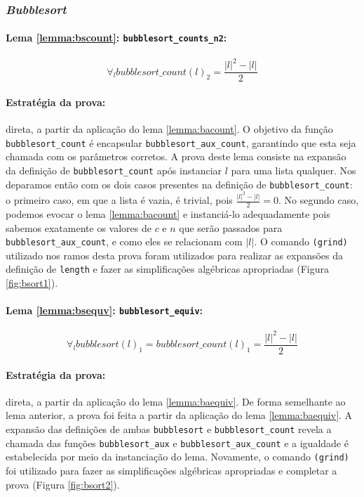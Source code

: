 \subsubsection{\textit{Bubblesort}}

\paragraph{Lema \ref{lemma:bscount}: \texttt{bubblesort\_counts\_n2}:}
\begin{equation*}
    \forall_{l} bubblesort\_count(l)_2 = \frac{|l|^2 - |l|}{2}
\end{equation*}

\paragraph{Estratégia da prova:} direta, a partir da aplicação do
lema \ref{lemma:bacount}. O objetivo da função \texttt{bubblesort\_count}
é encapsular \texttt{bubblesort\_aux\_count}, garantindo que esta
seja chamada com os parâmetros corretos. A prova deste lema consiste
na expansão da definição de \texttt{bubblesort\_count} após instanciar
$l$ para uma lista qualquer. Nos deparamos então com os dois casos
presentes na definição de \texttt{bubblesort\_count}: o primeiro caso,
em que a lista é vazia, é trivial, pois $\frac{|l|^2 - |l|}{2} = 0$.
No segundo caso, podemos evocar o lema \ref{lemma:bacount} e instanciá-lo
adequadamente pois sabemos exatamente os valores de $c$ e $n$ que serão
passados para \texttt{bubblesort\_aux\_count}, e como eles se
relacionam com $|l|$. O comando \texttt{(grind)} utilizado nos ramos
desta prova foram utilizados para realizar as expansões da definição de
\texttt{length} e fazer as simplificações algébricas apropriadas
(Figura \ref{fig:bsort1}).

\paragraph{Lema \ref{lemma:bsequv}: \texttt{bubblesort\_equiv}:}
\begin{equation*}
    \forall_{l} bubblesort(l)_1 = bubblesort\_count(l)_1 = \frac{|l|^2 - |l|}{2}
\end{equation*}

\paragraph{Estratégia da prova:} direta, a partir da aplicação do
lema \ref{lemma:baequiv}. De forma semelhante ao lema anterior, 
a prova foi feita a partir da aplicação do lema \ref{lemma:baequiv}.
A expansão das definições de ambas \texttt{bubblesort} e \texttt{bubblesort\_count}
revela a chamada das funções \texttt{bubblesort\_aux} e \texttt{bubblesort\_aux\_count}
e a igualdade é estabelecida por meio da instanciação do lema.
Novamente, o comando \texttt{(grind)} foi utilizado para fazer
as simplificações algébricas apropriadas e completar a prova
(Figura \ref{fig:bsort2}).

